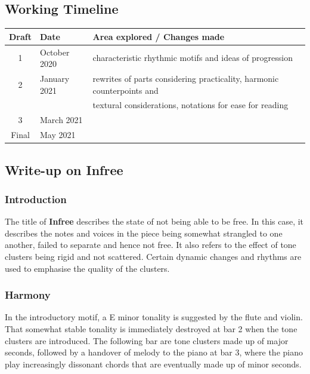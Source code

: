 \documentclass{article}
\begin{document}
\newpage

\subsection{Working Timeline}
\begin{center}
	\def\arraystretch{1.5}
\begin{tabular}{|c|l|l|}
	\hline
	Draft&Date&Area explored / Changes made\\
	\hline
	1&October 2020
    &characteristic rhythmic motifs and ideas of progression\\
	\hline
	2&January 2021
    &rewrites of parts considering practicality, harmonic counterpoints and\\
    &&textural considerations, notations for ease for reading\\
	\hline
	3&March 2021
    &\\
	\hline
	Final&May 2021&\\
	\hline
\end{tabular}
\end{center}

\subsection{Write-up on {\bf Infree}}

\subsubsection{Introduction}

The title of \textbf{Infree} describes the state of not being able to be free.
In this case, it describes the notes and voices in the piece being somewhat
strangled to one another, failed to separate and hence not free.
It also refers to the effect of tone clusters being rigid and not
scattered. Certain dynamic changes and rhythms are used to emphasise
the quality of the clusters.

\subsubsection{Harmony}

In the introductory motif,
a E minor tonality is suggested by the flute and violin.
That somewhat stable tonality is immediately destroyed at bar 2
when the tone clusters are introduced.
The following bar are tone clusters made up of major seconds,
followed by a handover of melody to the piano at bar 3,
where the piano play increasingly dissonant chords that are
eventually made up of minor seconds.\\
\end{document}
